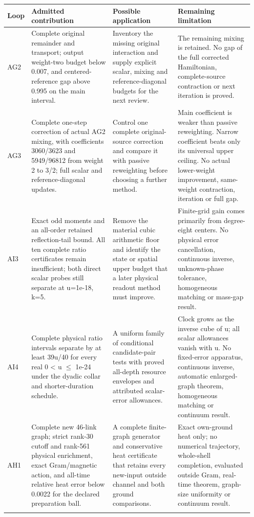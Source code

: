 \begingroup\small
\begin{longtable}{@{}>{\raggedright\arraybackslash}p{13mm}>{\raggedright\arraybackslash}p{52mm}>{\raggedright\arraybackslash}p{35mm}>{\raggedright\arraybackslash}p{47mm}@{}}
\toprule Loop & Admitted contribution & Possible application & Remaining limitation \\
\midrule\endhead
AG2 & Complete original remainder and transport; output weight-two budget below 0.007, and centered-reference gap above 0.995 on the main interval. & Inventory the missing original interaction and supply explicit scalar, mixing and reference-diagonal budgets for the next review. & The remaining mixing is retained. No gap of the full corrected Hamiltonian, complete-source contraction or next iteration is proved. \\ \addlinespace
AG3 & Complete one-step correction of actual AG2 mixing, with coefficients 3060/3623 and 5949/96812 from weight 2 to 3/2; full scalar and reference-diagonal updates. & Control one complete original-source correction and compare it with passive reweighting before choosing a further method. & Main coefficient is weaker than passive reweighting. Narrow coefficient beats only its universal upper ceiling. No actual lower-weight improvement, same-weight contraction, iteration or full gap. \\ \addlinespace
AI3 & Exact odd moments and an all-order retained reflection-tail bound. All ten complete ratio certificates remain insufficient; both direct scalar probes still separate at u=1e-18, k=5. & Remove the material cubic arithmetic floor and identify the state or spatial upper budget that a later physical readout method must improve. & Finite-grid gain comes primarily from degree-eight centers. No physical error cancellation, continuous inverse, unknown-phase tolerance, homogeneous matching or mass-gap result. \\ \addlinespace
AI4 & Complete physical ratio intervals separate by at least 39u/40 for every real 0 < u $\le$ 1e-24 under the dyadic collar and shorter-duration schedule. & A uniform family of conditional candidate-pair tests with proved all-depth resource envelopes and attributed scalar-error allowances. & Clock grows as the inverse cube of u; all scalar allowances vanish with u. No fixed-error apparatus, continuous inverse, automatic enlarged-graph theorem, homogeneous matching or continuum result. \\ \addlinespace
AH1 & Complete new 46-link graph; strict rank-30 cutoff and rank-561 physical enrichment, exact Gram/magnetic action, and all-time relative heat error below 0.0022 for the declared preparation ball. & A complete finite-graph generator and conservative heat certificate that retains every new-input outside channel and both ground comparisons. & Exact own-ground heat only; no numerical trajectory, whole-shell completion, evaluated outside Gram, real-time theorem, graph-size uniformity or continuum result. \\ \addlinespace

\end{longtable}
